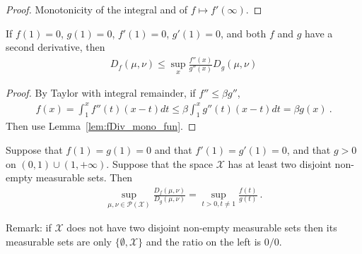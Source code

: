 \begin{proof}\leanok
Monotonicity of the integral and of $f \mapsto f'(\infty)$.
\end{proof}


\begin{lemma}
  \label{lem:fDiv_le_of_deriv2_le}
  If $f(1) = 0$, $g(1) = 0$, $f'(1) = 0$, $g'(1) = 0$, and both $f$ and $g$ have a second derivative, then
  \begin{align*}
  D_f(\mu, \nu) \le \sup_x \frac{f''(x)}{g''(x)} D_g(\mu, \nu)
  \end{align*}
\end{lemma}

\begin{proof}%
{}
By Taylor with integral remainder, if $f'' \le \beta g''$,
\begin{align*}
f(x) = \int_1^x f''(t) (x - t) dt
\le \beta \int_1^x g''(t) (x - t) dt
= \beta g(x)
\: .
\end{align*}
Then use Lemma~\ref{lem:fDiv_mono_fun}.
\end{proof}


\begin{theorem}
  \label{thm:fDiv_eq_sup_mul_fDiv}
  Suppose that $f(1) = g(1) = 0$ and that $f'(1) = g'(1) = 0$, and that $g>0$ on $(0,1) \cup (1, +\infty)$. Suppose that the space $\mathcal X$ has at least two disjoint non-empty measurable sets. Then
  \begin{align*}
  \sup_{\mu, \nu \in \mathcal P(\mathcal X)} \frac{D_f(\mu, \nu)}{D_g(\mu, \nu)}
  = \sup_{t > 0, t \ne 1} \frac{f(t)}{g(t)}
  \: .
  \end{align*}
\end{theorem}

Remark: if $\mathcal X$ does not have two disjoint non-empty measurable sets then its measurable sets are only $\{\emptyset, \mathcal X\}$ and the ratio on the left is $0/0$.

